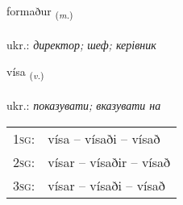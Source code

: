 \documentclass[frontgrid, backgrid]{flacards}\usepackage[]{graphicx}\usepackage[]{xcolor}
\begin{document}
\renewcommand{\flhead}{\vskip5pt \fboxsep=0pt {\small\bfseries\footnotesize Nafnorð | іменник}}
\renewcommand{\fcfoot}{\vskip5pt \fboxsep=0pt \hspace{2pt}{\small\bfseries\footnotesize 1K}}

\renewcommand{\blhead}{\vskip5pt {\small\bfseries\footnotesize Nafnorð | іменник }}
\renewcommand{\bcfoot}{\vskip5pt \hspace{2pt}{\small\bfseries\footnotesize 1K}}


{formaður \small{\textsubscript{(\textit{m.})}} \\[1ex] %
\textphonetic{[fɔrmaðʏr]} \\
ukr.: \emph{директор; шеф; керівник} \\  [2ex]
\renewcommand*{\arraystretch}{0.8}
}

\renewcommand{\flhead}{\vskip5pt \fboxsep=0pt {\small\bfseries\footnotesize Sagnorð | дієслово}}
\renewcommand{\fcfoot}{\vskip5pt \fboxsep=0pt \hspace{2pt}{\small\bfseries\footnotesize 1K}}

\renewcommand{\blhead}{\vskip5pt {\small\bfseries\footnotesize Sagnorð | дієслово }}
\renewcommand{\bcfoot}{\vskip5pt \hspace{2pt}{\small\bfseries\footnotesize 1K}}


{vísa \small{\textsubscript{(\textit{v.})}} \\[1ex] %
\textphonetic{[viːsa]} \\
ukr.: \emph{показувати; вказувати на} \\  [2ex]
\renewcommand*{\arraystretch}{0.8}
\begin{tabular}{p{1cm}l}
\textsc{1sg}: & vísa -- vísaði -- vísað \\ 
\textsc{2sg}: & vísar -- vísaðir -- vísað \\ 
\textsc{3sg}: & vísar -- vísaði -- vísað \\ 
\end{tabular}
}
\end{document}
